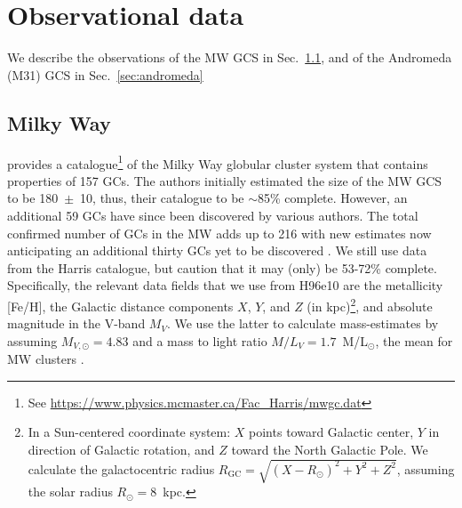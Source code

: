 \documentclass[a4paper,fleqn,usenatbib]{mnras}
\begin{document}
%


\section{Observational data}
\label{sec:observations}
We describe the observations of the MW GCS in Sec.~\ref{sec:milkyway}, 
and of the Andromeda (M31) GCS in Sec.~\ref{sec:andromeda}


\subsection{Milky Way}
\label{sec:milkyway}
\citet[][2010 edition; hereafter H96e10]{1996AJ....112.1487H} provides a
catalogue\footnote{See \url{https://www.physics.mcmaster.ca/Fac_Harris/mwgc.dat}}
of the Milky Way globular cluster system that contains properties of
157 GCs. The authors initially estimated the size of the MW GCS to be 180~$\pm$~10,
thus, their catalogue to be $\sim$85\% complete. However, an additional 59 GCs
have since been discovered by various authors. The total confirmed number of GCs
in the MW adds up to 216 with new estimates now anticipating an additional thirty
GCs yet to be discovered \citep[e.g.][and references therein]{2018ApJ...863L..38R}.
We still use data from the Harris catalogue, but caution that it may (only) be 
53-72\% complete. Specifically, the relevant data fields that we use from H96e10 
are the metallicity [Fe/H], the Galactic distance components $X$, $Y$, and $Z$ (in
kpc)\footnote{In a Sun-centered coordinate system: $X$ points toward Galactic
center, $Y$ in direction of Galactic rotation, and $Z$ toward the North Galactic
Pole. We calculate the galactocentric radius $R_{\text{GC}}=\sqrt{(X-R_\odot)^2
+ Y^2 + Z^2}$, assuming the solar radius $R_\odot=8$~kpc.}, and absolute
magnitude in the V-band $M_V$. We use the latter to calculate mass-estimates by
assuming $M_{V,\odot}=4.83$ and a mass to light ratio $M/L_V = 1.7$~M/L$_{\odot}$,
the mean for MW clusters \citep{2005ApJS..161..304M}.

\end{document}

